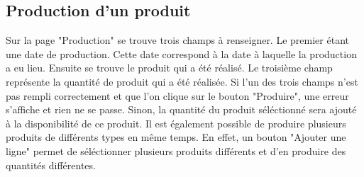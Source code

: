 \subsection{Production d'un produit}
Sur la page "Production" se trouve trois champs à renseigner. Le premier étant
une date de production. Cette date correspond à la date à laquelle la production
a eu lieu. Ensuite se trouve le produit qui a été réalisé. Le troisième champ
représente la quantité de produit qui a été réalisée. Si l'un des trois champs
n'est pas rempli correctement et que l'on clique sur le bouton "Produire", une
erreur s'affiche et rien ne se passe. Sinon, la quantité du produit séléctionné
sera ajouté à la disponibilité de ce produit. Il est également possible de
produire plusieurs produits de différents types en même temps. En effet, un
bouton "Ajouter une ligne" permet de séléctionner plusieurs produits différents
et d'en produire des quantités différentes.
